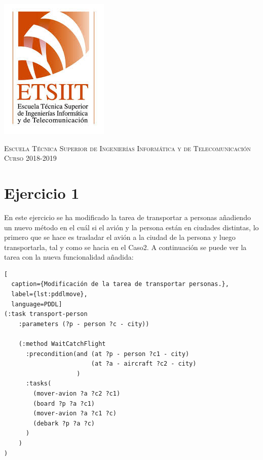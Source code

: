 \documentclass[11pt,a4paper]{article}
\begin{document}
\begin{titlepage}
\begin{minipage}{\textwidth}
\includegraphics[scale=0.3]{img/etsiit.jpeg}

\vspace{0.7cm}
\textsc{Escuela Técnica Superior de Ingenierías Informática y de Telecomunicación}\\
\vspace{1cm}
\textsc{Curso 2018-2019}
\end{minipage}
\end{titlepage}

\tableofcontents
\thispagestyle{empty}				%

\newpage

\setlength{\parskip}{1em}

\section{Ejercicio 1}

En este ejercicio se ha modificado la tarea de transportar a personas añadiendo un nuevo método en el cuál si el avión y la persona
están en ciudades distintas, lo primero que se hace es trasladar el avión a la ciudad de la persona y luego transportarla, tal y como
se hacia en el Caso2. A continuación se puede ver la tarea con la nueva funcionalidad añadida:

\begin{algorithm}[H]
\begin{lstlisting}[
  caption={Modificación de la tarea de transportar personas.},
  label={lst:pddlmove},
  language=PDDL]
(:task transport-person
	:parameters (?p - person ?c - city))
  
    (:method WaitCatchFlight
      :precondition(and (at ?p - person ?c1 - city)
                        (at ?a - aircraft ?c2 - city)
                    )
      :tasks(
        (mover-avion ?a ?c2 ?c1)
        (board ?p ?a ?c1)
        (mover-avion ?a ?c1 ?c)
        (debark ?p ?a ?c)
      )
    )
)
\end{lstlisting}
\end{algorithm}
\end{document}

